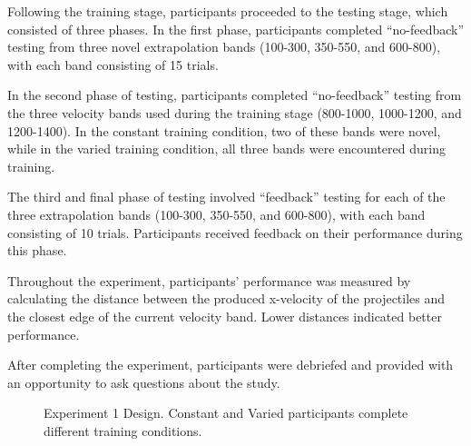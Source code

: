 \documentclass[
  letterpaper,
  DIV=11,
  numbers=noendperiod,
  oneside]{scrartcl}
\begin{document}
Following the training stage, participants proceeded to the testing
stage, which consisted of three phases. In the first phase, participants
completed ``no-feedback'' testing from three novel extrapolation bands
(100-300, 350-550, and 600-800), with each band consisting of 15 trials.

In the second phase of testing, participants completed ``no-feedback''
testing from the three velocity bands used during the training stage
(800-1000, 1000-1200, and 1200-1400). In the constant training
condition, two of these bands were novel, while in the varied training
condition, all three bands were encountered during training.

The third and final phase of testing involved ``feedback'' testing for
each of the three extrapolation bands (100-300, 350-550, and 600-800),
with each band consisting of 10 trials. Participants received feedback
on their performance during this phase.

Throughout the experiment, participants' performance was measured by
calculating the distance between the produced x-velocity of the
projectiles and the closest edge of the current velocity band. Lower
distances indicated better performance.

After completing the experiment, participants were debriefed and
provided with an opportunity to ask questions about the study.

\begin{figure}


\caption{\label{fig-design-e1}Experiment 1 Design. Constant and Varied
participants complete different training conditions.}

\end{figure}%
\end{document}
